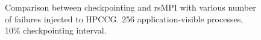\begin{figure}[!t]
  \begin{center}
  \end{center}
  \caption{Comparison between checkpointing and rsMPI with various number of failures injected to HPCCG. 256 application-visible processes, 10\% checkpointing interval.}
  \label{fig:multiple_failure}
  \vskip -0.2in
\end{figure}




